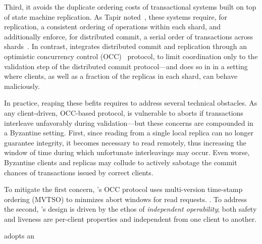 Third, it avoids the duplicate ordering costs of transactional systems
built on top of state machine replication. As Tapir noted~\cite{},
these systems require, for replication, a consistent ordering of
operations within each shard, and additionally enforce, for
distributed commit, a serial order of transactions across
shards~\cite{}. In contrast, \sys{} integrates distributed commit and
replication through an optimistic concurrency control (OCC)~\cite{} protocol, to
limit coordination only to the validation step of the distributed commit
protocol---and does so in in a setting where clients, as well as a
fraction of the replicas in each shard, can behave maliciously.

In practice, reaping these befits requires to address several
technical obstacles. As any client-driven, OCC-based protocol, \sys
is vulnerable to aborts if transactions interleave unfavorably during
validation---but these concerns are compounded in a Byzantine
setting. First, since reading from a single local replica can no
longer guarantee integrity, it becomes necessary to read remotely,
thus increasing the window of time during which unfortunate
interleavings may occur. Even worse,  Byzantine clients and replicas may
collude to actively sabotage the commit chances of transactions issued
by correct clients.


To mitigate the first concern, \sys's OCC protocol uses multi-version
time-stamp ordering (MVTSO) to minmizes abort windows for read
requests.  .  To address the second, \sys's design is driven
by the ethos of \textit{independent operability}; both safety
 and liveness  are per-client properties and independent from one
client to another.

adopts an 




